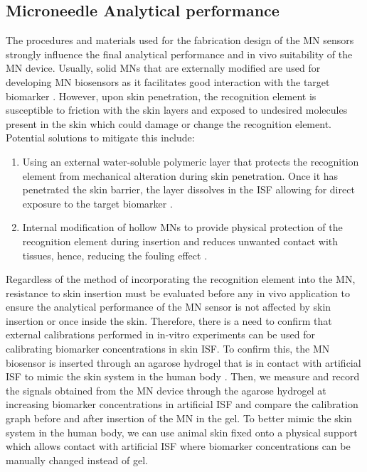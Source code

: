 \begin{appendices}
\subsection{Microneedle Analytical performance}
\label{micro_no2}
The procedures and materials used for the fabrication design of the MN sensors strongly influence the final analytical performance and in vivo suitability of the MN device. Usually, solid MNs that are externally modified are used for developing MN biosensors as it facilitates good interaction with the target biomarker \cite{calio2016polymeric,bollella2019minimally}. However, upon skin penetration, the recognition element is susceptible to friction with the skin layers and exposed to undesired molecules present in the skin which could damage or change the recognition element. Potential solutions to mitigate this include: 
\begin{enumerate}
    \item Using an external water-soluble polymeric layer that protects the recognition element from mechanical alteration during skin penetration. Once it has penetrated the skin barrier, the layer dissolves in the ISF allowing for direct exposure to the target biomarker \cite{jin2019reduced}.
    \item Internal modification of hollow MNs to provide physical protection of the recognition element during insertion and reduces unwanted contact with tissues, hence, reducing the fouling effect \cite{zhao2020silk,miller2012multiplexed}.
\end{enumerate}
Regardless of the method of incorporating the recognition element into the MN, resistance to skin insertion must be evaluated before any in vivo application to ensure the analytical performance of the MN sensor is not affected by skin insertion or once inside the skin. 
Therefore, there is a need to confirm that external calibrations performed in in-vitro experiments can be used for calibrating biomarker concentrations in skin ISF. To confirm this, the MN biosensor is inserted through an agarose hydrogel that is in contact with artificial ISF to mimic the skin system in the human body \cite{bollella2019minimally}. Then, we measure and record the signals obtained from the MN device through the agarose hydrogel at increasing biomarker concentrations in artificial ISF and compare the calibration graph before and after insertion of the MN in the gel. To better mimic the skin system in the human body, we can use animal skin fixed onto a physical support which allows contact with artificial ISF where biomarker concentrations can be manually changed instead of gel. 

\end{appendices}
